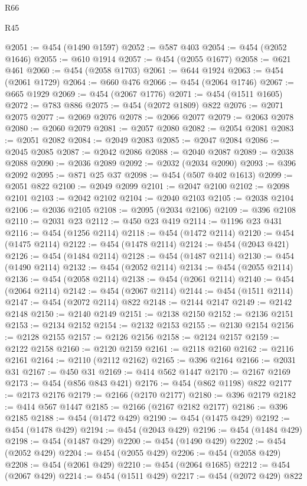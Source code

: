 \begin{lexlean}{R66}
\begin{lexlean}{R45}
\begin{coremodule}
{{{{{{{{{{{{{{{{{{{{{{{{{{{{{{{{{{{{{{{{{{{{{{{{{{{{{{{{{{{{{{{{{{{{{{{{{{{{{{{{{{{{{{{{{{{@2051 := @454 (@1490 @1597)
@2052 := @587 @403
@2054 := @454 (@2052 @1646)
@2055 := @610 @1914
@2057 := @454 (@2055 @1677)
@2058 := @621 @461
@2060 := @454 (@2058 @1703)
@2061 := @644 @1924
@2063 := @454 (@2061 @1729)
@2064 := @660 @476
@2066 := @454 (@2064 @1746)
@2067 := @665 @1929
@2069 := @454 (@2067 @1776)
@2071 := @454 (@1511 @1605)
@2072 := @783 @886
@2075 := @454 (@2072 @1809) @822
@2076 := @2071 @2075
@2077 := @2069 @2076
@2078 := @2066 @2077
@2079 := @2063 @2078
@2080 := @2060 @2079
@2081 := @2057 @2080
@2082 := @2054 @2081
@2083 := @2051 @2082
@2084 := @2049 @2083
@2085 := @2047 @2084
@2086 := @2045 @2085
@2087 := @2042 @2086
@2088 := @2040 @2087
@2089 := @2038 @2088
@2090 := @2036 @2089
@2092 := @2032 (@2034 @2090)
@2093 := @396 @2092
@2095 := @871 @25 @37
@2098 := @454 (@507 @402 @1613)
@2099 := @2051 @822
@2100 := @2049 @2099
@2101 := @2047 @2100
@2102 := @2098 @2101
@2103 := @2042 @2102
@2104 := @2040 @2103
@2105 := @2038 @2104
@2106 := @2036 @2105
@2108 := @2095 (@2034 @2106)
@2109 := @396 @2108
@2110 := @2031 @23
@2112 := @450 @23 @419
@2114 := @1196 @23 @431
@2116 := @454 (@1256 @2114)
@2118 := @454 (@1472 @2114)
@2120 := @454 (@1475 @2114)
@2122 := @454 (@1478 @2114)
@2124 := @454 (@2043 @421)
@2126 := @454 (@1484 @2114)
@2128 := @454 (@1487 @2114)
@2130 := @454 (@1490 @2114)
@2132 := @454 (@2052 @2114)
@2134 := @454 (@2055 @2114)
@2136 := @454 (@2058 @2114)
@2138 := @454 (@2061 @2114)
@2140 := @454 (@2064 @2114)
@2142 := @454 (@2067 @2114)
@2144 := @454 (@1511 @2114)
@2147 := @454 (@2072 @2114) @822
@2148 := @2144 @2147
@2149 := @2142 @2148
@2150 := @2140 @2149
@2151 := @2138 @2150
@2152 := @2136 @2151
@2153 := @2134 @2152
@2154 := @2132 @2153
@2155 := @2130 @2154
@2156 := @2128 @2155
@2157 := @2126 @2156
@2158 := @2124 @2157
@2159 := @2122 @2158
@2160 := @2120 @2159
@2161 := @2118 @2160
@2162 := @2116 @2161
@2164 := @2110 (@2112 @2162)
@2165 := @396 @2164
@2166 := @2031 @31
@2167 := @450 @31
@2169 := @414 @562 @1447
@2170 := @2167 @2169
@2173 := @454 (@856 @843 @421)
@2176 := @454 (@862 @1198) @822
@2177 := @2173 @2176
@2179 := @2166 (@2170 @2177)
@2180 := @396 @2179
@2182 := @414 @567 @1447
@2185 := @2166 (@2167 @2182 @2177)
@2186 := @396 @2185
@2188 := @454 (@1472 @429)
@2190 := @454 (@1475 @429)
@2192 := @454 (@1478 @429)
@2194 := @454 (@2043 @429)
@2196 := @454 (@1484 @429)
@2198 := @454 (@1487 @429)
@2200 := @454 (@1490 @429)
@2202 := @454 (@2052 @429)
@2204 := @454 (@2055 @429)
@2206 := @454 (@2058 @429)
@2208 := @454 (@2061 @429)
@2210 := @454 (@2064 @1685)
@2212 := @454 (@2067 @429)
@2214 := @454 (@1511 @429)
@2217 := @454 (@2072 @429) @822
}}}}}}}}}}}}}}}}}}}}}}}}}}}}}}}}}}}}}}}}}}}}}}}}}}}}}}}}}}}}}}}}}}}}}}}}}}}}}}}}}}}}}}}}}}}
\end{coremodule}
\end{lexlean}
\end{lexlean}
